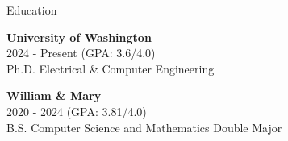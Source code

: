 \begin{rSection}{Education}

{\textbf {University of Washington} }
\\ 2024 - Present (GPA: 3.6/4.0)
\\ Ph.D. Electrical \& Computer Engineering

{\textbf {William \& Mary} }
\\ 2020 - 2024 (GPA: 3.81/4.0)
\\ B.S. Computer Science and Mathematics Double Major

\end{rSection}
